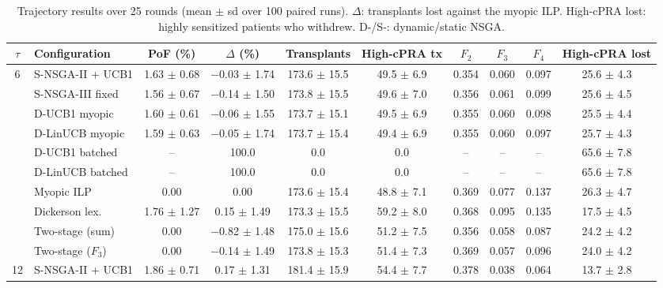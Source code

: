 \begin{table}[!t]
\centering
\caption{Trajectory results over 25 rounds (mean $\pm$ sd over 100
paired runs). $\Delta$: transplants lost against the myopic ILP.
High-cPRA lost: highly sensitized patients who withdrew.
D-/S-: dynamic/static NSGA.}
\label{tab:main}
\footnotesize
\setlength{\tabcolsep}{3.5pt}
\begin{tabular}{@{}cl cccccccc@{}}
\toprule
$\tau$ & Configuration & PoF (\%) & $\Delta$ (\%) & Transplants
 & High-cPRA tx & $F_2$ & $F_3$ & $F_4$ & High-cPRA lost \\
\midrule
\multirow{10}{*}{6}
 & S-NSGA-II + UCB1   & 1.63 $\pm$ 0.68 & $-$0.03 $\pm$ 1.74 & 173.6 $\pm$ 15.5 & 49.5 $\pm$ 6.9 & 0.354 & 0.060 & 0.097 & 25.6 $\pm$ 4.3 \\
 & S-NSGA-III fixed   & 1.56 $\pm$ 0.67 & $-$0.14 $\pm$ 1.50 & 173.8 $\pm$ 15.5 & 49.6 $\pm$ 7.0 & 0.356 & 0.061 & 0.099 & 25.6 $\pm$ 4.5 \\
 & D-UCB1 myopic      & 1.60 $\pm$ 0.61 & $-$0.06 $\pm$ 1.55 & 173.7 $\pm$ 15.1 & 49.5 $\pm$ 6.9 & 0.355 & 0.060 & 0.098 & 25.5 $\pm$ 4.4 \\
 & D-LinUCB myopic    & 1.59 $\pm$ 0.63 & $-$0.05 $\pm$ 1.74 & 173.7 $\pm$ 15.4 & 49.4 $\pm$ 6.9 & 0.355 & 0.060 & 0.097 & 25.7 $\pm$ 4.3 \\
 & D-UCB1 batched     & --              & 100.0              & 0.0              & 0.0            & --    & --    & --    & 65.6 $\pm$ 7.8 \\
 & D-LinUCB batched   & --              & 100.0              & 0.0              & 0.0            & --    & --    & --    & 65.6 $\pm$ 7.8 \\
 & Myopic ILP         & 0.00            & 0.00               & 173.6 $\pm$ 15.4 & 48.8 $\pm$ 7.1 & 0.369 & 0.077 & 0.137 & 26.3 $\pm$ 4.7 \\
 & Dickerson lex.     & 1.76 $\pm$ 1.27 & 0.15 $\pm$ 1.49    & 173.3 $\pm$ 15.5 & 59.2 $\pm$ 8.0 & 0.368 & 0.095 & 0.135 & 17.5 $\pm$ 4.5 \\
 & Two-stage (sum)    & 0.00            & $-$0.82 $\pm$ 1.48 & 175.0 $\pm$ 15.6 & 51.2 $\pm$ 7.5 & 0.356 & 0.058 & 0.087 & 24.2 $\pm$ 4.2 \\
 & Two-stage ($F_3$)  & 0.00            & $-$0.14 $\pm$ 1.49 & 173.8 $\pm$ 15.3 & 51.4 $\pm$ 7.3 & 0.369 & 0.057 & 0.096 & 24.0 $\pm$ 4.2 \\
\midrule
\multirow{10}{*}{12}
 & S-NSGA-II + UCB1   & 1.86 $\pm$ 0.71 & 0.17 $\pm$ 1.31   & 181.4 $\pm$ 15.9 & 54.4 $\pm$ 7.7 & 0.378 & 0.038 & 0.064 & 13.7 $\pm$ 2.8 \\

\end{tabular}
\end{table}
